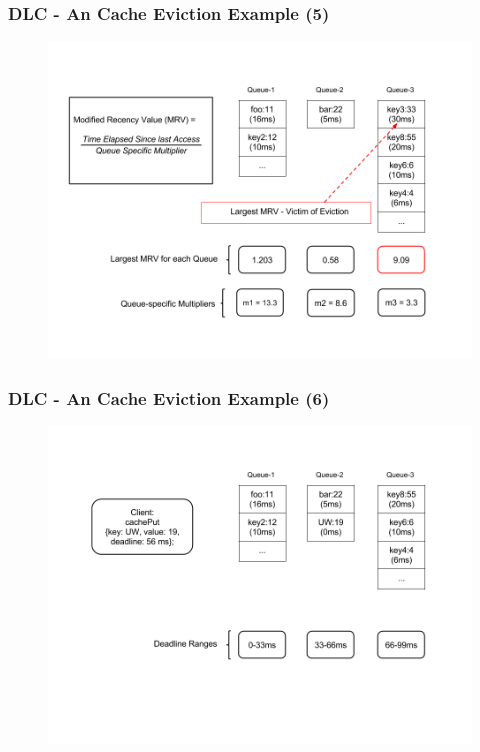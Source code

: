 \documentclass{beamer}
\begin{document}
\begin{frame}
  \frametitle{DLC - An Cache Eviction Example (5)}
  \begin{figure}
    \begin{center}
      \centerline{\includegraphics[scale=0.33]{img/DLC_NEW_5.png}}
    \end{center}
  \end{figure}
\end{frame}

\begin{frame}
  \frametitle{DLC - An Cache Eviction Example (6)}
  \begin{figure}
    \begin{center}
      \centerline{\includegraphics[scale=0.33]{img/DLC_NEW_6.png}}
    \end{center}
  \end{figure}
\end{frame}
\end{document}
